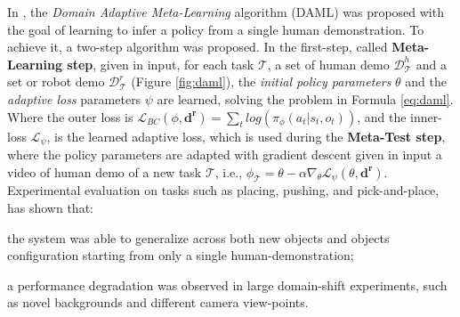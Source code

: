 In \cite{yu2018daml}, the \textit{Domain Adaptive Meta-Learning} algorithm (DAML) was proposed with the goal of learning to infer a policy from a single human demonstration. To achieve it, a two-step algorithm was proposed. In the first-step, called \textbf{Meta-Learning step}, given in input, for each task $\mathcal{T}$, a set of human demo $\mathcal{D}^{h}_{\mathcal{T}}$ and a set or robot demo $\mathcal{D}^{r}_{\mathcal{T}}$ (Figure \ref{fig:daml}), the \textit{initial policy parameters} $\theta$ and the \textit{adaptive loss} parameters $\psi$ are learned, solving the problem in Formula \ref{eq:daml}. 
\newline Where the outer loss is $\mathcal{L}_{BC}(\phi,\mathbf{d^{r}}) = \sum_{t} log(\pi_{\phi}(a_{t}|s_{t},o_{t}))$, and the inner-loss $\mathcal{L}_{\psi}$, is the learned adaptive loss, which is used during the \textbf{Meta-Test step}, where the policy parameters are adapted with gradient descent given in input a video of human demo of a new task $\mathcal{T}$, i.e., $\phi_{\mathcal{T}} = \theta - \alpha \nabla_{\theta} \mathcal{L}_{\psi}(\theta, \mathbf{d^{r}})$. Experimental evaluation on tasks such as placing, pushing, and pick-and-place, has shown that: \begin{enumerate*}[label=\textbf{(\alph*)}]
    \item the system was able to generalize across both new objects and objects configuration starting from only a single human-demonstration;
    \item a performance degradation was observed in large domain-shift experiments, such as novel backgrounds and different camera view-points.
\end{enumerate*}

